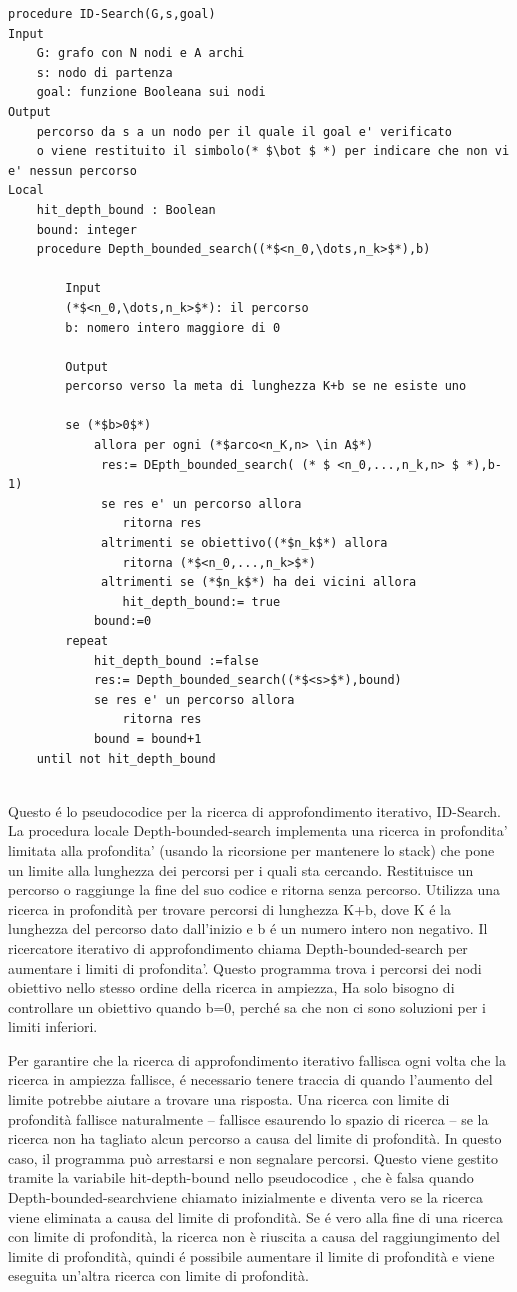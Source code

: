 \documentclass[a4paper]{extarticle}
\begin{document}
\begin{lstlisting}
procedure ID-Search(G,s,goal)
Input
	G: grafo con N nodi e A archi
	s: nodo di partenza
	goal: funzione Booleana sui nodi
Output
	percorso da s a un nodo per il quale il goal e' verificato 
	o viene restituito il simbolo(* $\bot $ *) per indicare che non vi e' nessun percorso
Local
	hit_depth_bound : Boolean
	bound: integer
	procedure Depth_bounded_search((*$<n_0,\dots,n_k>$*),b)
	
		Input
		(*$<n_0,\dots,n_k>$*): il percorso
		b: nomero intero maggiore di 0
		
		Output
		percorso verso la meta di lunghezza K+b se ne esiste uno
		
		se (*$b>0$*)
			allora per ogni (*$arco<n_K,n> \in A$*)
			 res:= DEpth_bounded_search( (* $ <n_0,...,n_k,n> $ *),b-1)
			 se res e' un percorso allora
			 	ritorna res
			 altrimenti se obiettivo((*$n_k$*) allora
			 	ritorna (*$<n_0,...,n_k>$*)
			 altrimenti se (*$n_k$*) ha dei vicini allora
			 	hit_depth_bound:= true
			bound:=0
		repeat
			hit_depth_bound :=false
			res:= Depth_bounded_search((*$<s>$*),bound)
			se res e' un percorso allora
				ritorna res
			bound = bound+1
	until not hit_depth_bound
		
\end{lstlisting}

Questo é lo pseudocodice per la ricerca di approfondimento iterativo, ID-Search. La procedura locale Depth-bounded-search implementa una ricerca in profondita' limitata alla profondita' (usando la ricorsione per mantenere lo stack) che pone un limite alla lunghezza dei percorsi per i quali sta cercando. Restituisce un percorso o raggiunge la fine del suo codice e ritorna senza percorso. Utilizza una ricerca in profondità per trovare percorsi di lunghezza K+b, dove K é la lunghezza del percorso dato dall'inizio e b é un numero intero non negativo. Il ricercatore iterativo di approfondimento chiama Depth-bounded-search per aumentare i limiti di profondita'. Questo programma trova i percorsi dei nodi obiettivo nello stesso ordine della ricerca in ampiezza, Ha solo bisogno di controllare un obiettivo quando b=0, perché sa che non ci sono soluzioni per i limiti inferiori.

Per garantire che la ricerca di approfondimento iterativo fallisca ogni volta che la ricerca in ampiezza fallisce, é necessario tenere traccia di quando l'aumento del limite potrebbe aiutare a trovare una risposta. Una ricerca con limite di profondità fallisce naturalmente – fallisce esaurendo lo spazio di ricerca – se la ricerca non ha tagliato alcun percorso a causa del limite di profondità. In questo caso, il programma può arrestarsi e non segnalare percorsi. Questo viene gestito tramite la variabile hit-depth-bound nello pseudocodice , che è falsa quando Depth-bounded-searchviene chiamato inizialmente e diventa vero se la ricerca viene eliminata a causa del limite di profondità. Se é vero alla fine di una ricerca con limite di profondità, la ricerca non è riuscita a causa del raggiungimento del limite di profondità, quindi é possibile aumentare il limite di profondità e viene eseguita un'altra ricerca con limite di profondità.
\end{document}
